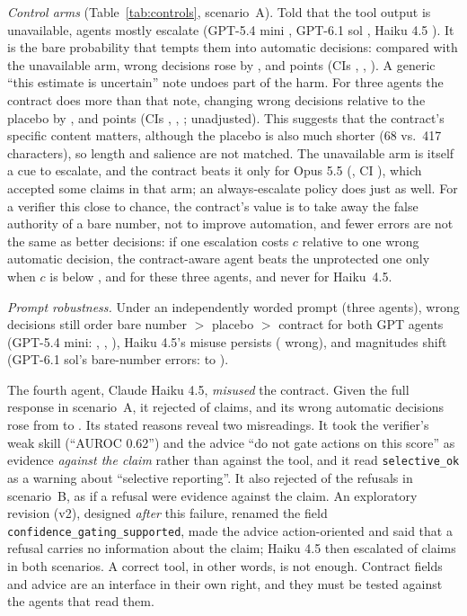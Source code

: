 \documentclass[conference]{IEEEtran}
\begin{document}
\emph{Control arms} (Table~\ref{tab:controls}, scenario~A). Told that the tool output is unavailable, agents mostly escalate (GPT-5.4 mini \agMiniANotoolEsc{}, GPT-6.1 sol \agSolANotoolEsc{}, Haiku 4.5 \agHaikuANotoolEsc{}). It is the bare probability that tempts them into automatic decisions: compared with the unavailable arm, wrong decisions rose by \agMiniAUnpVsNo{}, \agSolAUnpVsNo{} and \agHaikuAUnpVsNo{} points (CIs \agMiniAUnpVsNoCi{}, \agSolAUnpVsNoCi{}, \agHaikuAUnpVsNoCi{}). A generic ``this estimate is uncertain'' note undoes part of the harm. For three agents the contract does more than that note, changing wrong decisions relative to the placebo by \agMiniAConVsPla{}, \agSolAConVsPla{} and \agOpusAConVsPla{} points (CIs \agMiniAConVsPlaCi{}, \agSolAConVsPlaCi{}, \agOpusAConVsPlaCi{}; unadjusted). This suggests that the contract's specific content matters, although the placebo is also much shorter (68 vs.\ 417 characters), so length and salience are not matched. The unavailable arm is itself a cue to escalate, and the contract beats it only for Opus 5.5 (\agOpusAConVsNo{}, CI \agOpusAConVsNoCi{}), which accepted some claims in that arm; an always-escalate policy does just as well. For a verifier this close to chance, the contract's value is to take away the false authority of a bare number, not to improve automation, and fewer errors are not the same as better decisions: if one escalation costs $c$ relative to one wrong automatic decision, the contract-aware agent beats the unprotected one only when $c$ is below \agMiniABreakeven{}, \agSolABreakeven{} and \agOpusABreakeven{} for these three agents, and never for Haiku~4.5.

\emph{Prompt robustness.} Under an independently worded prompt (three agents), wrong decisions still order bare number $>$ placebo $>$ contract for both GPT agents (GPT-5.4 mini: \agMiniAUPtwoErr{}, \agMiniAPlaPtwoErr{}, \agMiniACPtwoErr{}), Haiku 4.5's misuse persists (\agHaikuACPtwoErr{} wrong), and magnitudes shift (GPT-6.1 sol's bare-number errors: \agSolAUAutoerror{} to \agSolAUPtwoErr{}).



The fourth agent, Claude Haiku 4.5, \emph{misused} the contract. Given the full response in scenario~A, it rejected \agHaikuACRej{} of claims, and its wrong automatic decisions rose from \agHaikuAUAutoerror{} to \agHaikuACAutoerror{}. Its stated reasons reveal two misreadings. It took the verifier's weak skill (``AUROC 0.62'') and the advice ``do not gate actions on this score'' as evidence \emph{against the claim} rather than against the tool, and it read \texttt{selective\_ok} as a warning about ``selective reporting''.
It also rejected \agHaikuBCRej{} of the refusals in scenario~B, as if a refusal were evidence against the claim. An exploratory revision (v2), designed \emph{after} this failure, renamed the field \texttt{confidence\_gating\_supported}, made the advice action-oriented and said that a refusal carries no information about the claim; Haiku 4.5 then escalated \agHaikuAVtwoEsc{} of claims in both scenarios. A correct tool, in other words, is not enough. Contract fields and advice are an interface in their own right, and they must be tested against the agents that read them.
\end{document}
